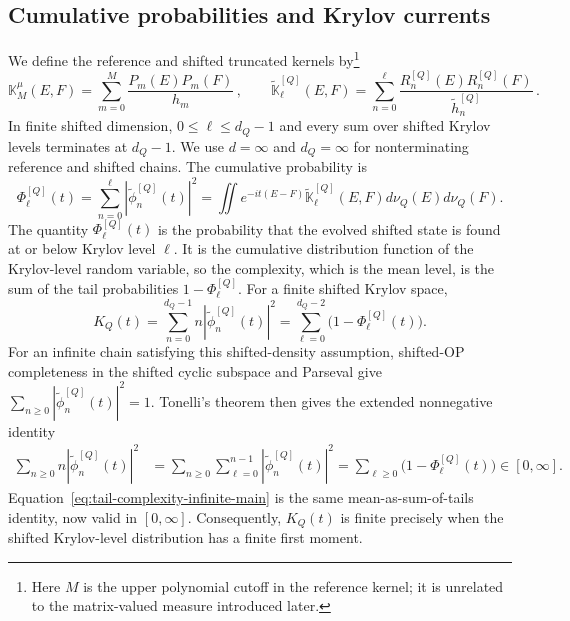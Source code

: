 \documentclass[a4paper,11pt]{article}
\def\dd{d}%
\def\ii{i}%
\def\ee{e}%
\theoremstyle{definition}
\theoremstyle{remark}
\newcommand{\dd}{\mathrm d}
\newcommand{\ii}{\mathrm i}
\newcommand{\ee}{\mathrm e}
\newcommand{\tphi}{\widetilde\phi}
\newcommand{\thh}{\widetilde h}
\newcommand{\tK}{\widetilde{\mathbb K}}
\begin{document}
\subsection{Cumulative probabilities and Krylov currents}
\label{subsec:cumulative-currents}
We define the reference and shifted truncated kernels by\footnote{Here $M$ is the upper polynomial cutoff in the reference kernel; it is unrelated to the matrix-valued measure introduced later.}
\begin{equation}
   \mathbb K_M^\mu(E,F)
   =
   \sum_{m=0}^{M}\frac{P_m(E)P_m(F)}{h_m}\,,
   \qquad
   \tK_\ell^{[Q]}(E,F)
   =
   \sum_{n=0}^{\ell}
   \frac{R_n^{[Q]}(E)R_n^{[Q]}(F)}
   {\thh_n^{[Q]}}\,.
   \label{eq:kernels-def}
\end{equation}
In finite shifted dimension, $0\le\ell\le d_Q-1$ and every sum over shifted Krylov levels terminates at $d_Q-1$. We use $d=\infty$ and $d_Q=\infty$ for nonterminating reference and shifted chains. The cumulative probability is
\begin{equation}
   \Phi_\ell^{[Q]}(t)
   =
   \sum_{n=0}^{\ell}|\tphi_n^{[Q]}(t)|^2
   =
   \iint
   \ee^{-\ii t(E-F)}
   \tK_\ell^{[Q]}(E,F)
   \dd\nu_Q(E)\dd\nu_Q(F).
   \label{eq:cumulative-kernel}
\end{equation}
The quantity $\Phi_\ell^{[Q]}(t)$ is the probability that the evolved shifted state is found
at or below Krylov level $\ell$. It is the cumulative distribution function of the Krylov-level
random variable, so the complexity, which is the mean level, is the sum of the tail probabilities
$1-\Phi_\ell^{[Q]}$. For a finite shifted Krylov space,
\begin{equation}
   K_Q(t)
   =
   \sum_{n=0}^{d_Q-1}
   n|\tphi_n^{[Q]}(t)|^2
   =
   \sum_{\ell=0}^{d_Q-2}
   \bigl(1-\Phi_\ell^{[Q]}(t)\bigr).
   \label{eq:tail-complexity}
\end{equation}
For an infinite chain satisfying this shifted-density assumption, shifted-OP completeness in the shifted cyclic subspace and Parseval give
$\sum_{n\ge0}|\tphi_n^{[Q]}(t)|^2=1$. Tonelli's theorem \cite{Folland1999} then gives the extended nonnegative identity
\begin{equation}
\begin{aligned}
   \sum_{n\ge0}n|\tphi_n^{[Q]}(t)|^2
   &=
   \sum_{n\ge0}
   \sum_{\ell=0}^{n-1}
   |\tphi_n^{[Q]}(t)|^2
   =
   \sum_{\ell\ge0}
   \bigl(1-\Phi_\ell^{[Q]}(t)\bigr)
   \in[0,\infty].
\end{aligned}
   \label{eq:tail-complexity-infinite-main}
\end{equation}
Equation~\eqref{eq:tail-complexity-infinite-main} is the same mean-as-sum-of-tails identity, now valid in $[0,\infty]$. Consequently, $K_Q(t)$ is finite precisely when the shifted Krylov-level distribution has a finite first moment.
\end{document}
